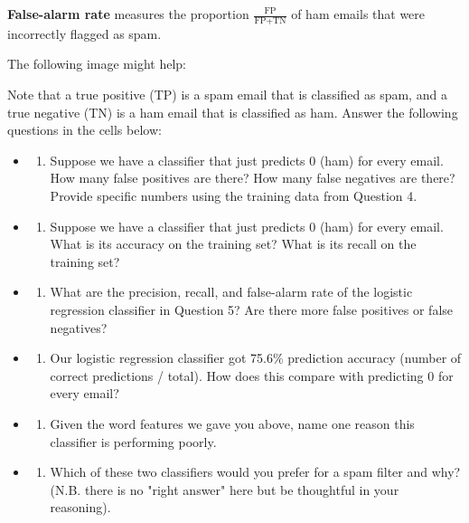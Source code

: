 \documentclass[11pt]{article}
\providecommand{\tightlist}{%
      \setlength{\itemsep}{0pt}\setlength{\parskip}{0pt}}
\begin{document}
\textbf{False-alarm rate} measures the proportion
\(\frac{\text{FP}}{\text{FP} + \text{TN}}\) of ham emails that were
incorrectly flagged as spam.

The following image might help:

Note that a true positive (TP) is a spam email that is classified as
spam, and a true negative (TN) is a ham email that is classified as ham.
Answer the following questions in the cells below:

\begin{itemize}
\item
  \begin{enumerate}
  \def\labelenumi{(\alph{enumi})}
  \tightlist
  \item
    Suppose we have a classifier that just predicts 0 (ham) for every
    email. How many false positives are there? How many false negatives
    are there? Provide specific numbers using the training data from
    Question 4.
  \end{enumerate}
\item
  \begin{enumerate}
  \def\labelenumi{(\alph{enumi})}
  \setcounter{enumi}{1}
  \tightlist
  \item
    Suppose we have a classifier that just predicts 0 (ham) for every
    email. What is its accuracy on the training set? What is its recall
    on the training set?
  \end{enumerate}
\item
  \begin{enumerate}
  \def\labelenumi{(\alph{enumi})}
  \setcounter{enumi}{2}
  \tightlist
  \item
    What are the precision, recall, and false-alarm rate of the logistic
    regression classifier in Question 5? Are there more false positives
    or false negatives?
  \end{enumerate}
\item
  \begin{enumerate}
  \def\labelenumi{(\alph{enumi})}
  \setcounter{enumi}{3}
  \tightlist
  \item
    Our logistic regression classifier got 75.6\% prediction accuracy
    (number of correct predictions / total). How does this compare with
    predicting 0 for every email?
  \end{enumerate}
\item
  \begin{enumerate}
  \def\labelenumi{(\alph{enumi})}
  \setcounter{enumi}{4}
  \tightlist
  \item
    Given the word features we gave you above, name one reason this
    classifier is performing poorly.
  \end{enumerate}
\item
  \begin{enumerate}
  \def\labelenumi{(\alph{enumi})}
  \setcounter{enumi}{5}
  \tightlist
  \item
    Which of these two classifiers would you prefer for a spam filter
    and why? (N.B. there is no "right answer" here but be thoughtful in
    your reasoning).
  \end{enumerate}
\end{itemize}
\end{document}
